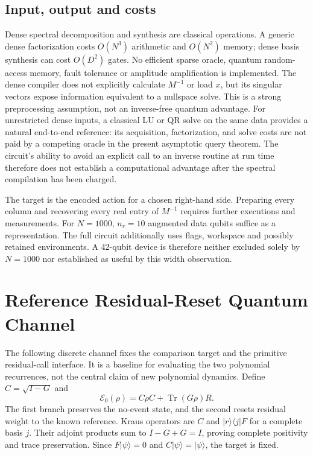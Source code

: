 \documentclass{ieeeaccess}
\newcommand{\ket}[1]{\lvert #1\rangle}\newcommand{\bra}[1]{\langle #1\rvert}
\newcommand{\Tr}{\operatorname{Tr}}\newcommand{\E}{\mathcal E}
\begin{document}
\subsection{Input, output and costs}
Dense spectral decomposition and synthesis are classical operations. A generic dense factorization costs $O(N^3)$ arithmetic and $O(N^2)$ memory; dense basis synthesis can cost $O(D^2)$ gates. No efficient sparse oracle, quantum random-access memory, fault tolerance or amplitude amplification is implemented. The dense compiler does not explicitly calculate $M^{-1}$ or load $x$, but its singular vectors expose information equivalent to a nullspace solve. This is a strong preprocessing assumption, not an inverse-free quantum advantage. For unrestricted dense inputs, a classical LU or QR solve on the same data provides a natural end-to-end reference: its acquisition, factorization, and solve costs are not paid by a competing oracle in the present asymptotic query theorem. The circuit's ability to avoid an explicit call to an inverse routine at run time therefore does not establish a computational advantage after the spectral compilation has been charged.

The target is the encoded action for a chosen right-hand side. Preparing every column and recovering every real entry of $M^{-1}$ requires further executions and measurements. For $N=1000$, $n_r=10$ augmented data qubits suffice as a representation. The full circuit additionally uses flags, workspace and possibly retained environments. A 42-qubit device is therefore neither excluded solely by $N=1000$ nor established as useful by this width observation.


\section{Reference Residual-Reset Quantum Channel}\label{sec:baseline}
The following discrete channel fixes the comparison target and the primitive residual-call interface. It is a baseline for evaluating the two polynomial recurrences, not the central claim of new polynomial dynamics.
Define $C=\sqrt{I-G}$ and
\begin{equation}\label{eq:baseline}
\E_0(\rho)=C\rho C+\Tr(G\rho)R.
\end{equation}
The first branch preserves the no-event state, and the second resets residual weight to the known reference. Kraus operators are $C$ and $\ket r\bra j F$ for a complete basis $j$. Their adjoint products sum to $I-G+G=I$, proving complete positivity and trace preservation. Since $F\ket\psi=0$ and $C\ket\psi=\ket\psi$, the target is fixed.
\end{document}
